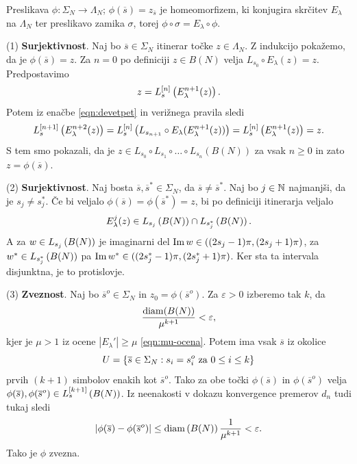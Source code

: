 \begin{izrek}
    Preslikava \(\phi \colon \Sigma_N \to \Lambda_N\); \(\phi (\overline{s}) = z_{\overline{s}}\) je homeomorfizem, ki konjugira skrčitev \(E_\lambda\) na \(\Lambda_N\) ter preslikavo zamika \(\sigma\), torej \(\phi \circ \sigma = E_\lambda \circ \phi\).
\end{izrek}

\begin{dokaz}
    (1) \textbf{Surjektivnost}. Naj bo \(\overline{s} \in \Sigma_N\) itinerar točke \(z \in \Lambda_N\). Z indukcijo pokažemo, da je \(\phi (\overline{s}) = z\). Za \(n = 0\) po definiciji \(z \in B (N)\) velja \(L_{s_0} \circ E_\lambda (z) = z\). Predpostavimo
    \[z = L_{s}^{[n]} \left( E_{\lambda}^{n + 1} (z) \right).\]
    Potem iz enačbe \eqref{eqn:devetpet} in verižnega pravila sledi
    \[L_{s}^{[n + 1]} \left( E_{\lambda}^{n + 2} (z) \right) = L_{s}^{[n]} \left( L_{s_{n + 1}} \circ E_\lambda (E_\lambda^{n + 1} (z)) \right) = L_{s}^{[n]} \left( E_\lambda^{n + 1} (z) \right) = z.\]
    S tem smo pokazali, da je \(z \in L_{s_0} \circ L_{s_1} \circ \dots \circ L_{s_n} (B (N))\) za vsak \(n \geq 0\) in zato \(z = \phi (\overline{s})\).

    (2) \textbf{Surjektivnost}. Naj bosta \(\overline{s}, \overline{s}^* \in \Sigma_N\), da \(\overline{s} \neq \overline{s}^*\). Naj bo \(j \in \mathbb N\) najmanjši, da je \(s_j \neq s_j^*\). Če bi veljalo \(\phi (\overline{s}) = \phi (\overline{s}^*) = z\), bi po definiciji itinerarja veljalo
    \[E_\lambda^j (z)\in L_{s_j} \left( B (N) \right) \cap L_{s_j^*} \left( B (N) \right).\]
    A za \(w \in L_{s_j} \left( B (N) \right)\) je imaginarni del \(\operatorname{Im} w \in ((2 s_j - 1) \pi, (2 s_j + 1) \pi)\), za \(w^* \in L_{s_j^*} \left( B (N) \right)\) pa \(\operatorname{Im} w^* \in ((2 s_j^* - 1) \pi, (2 s_j^* + 1) \pi)\). Ker sta ta intervala disjunktna, je to protislovje.

    (3) \textbf{Zveznost}. Naj bo \(\overline{s}^o \in \Sigma_N\) in \(z_0 = \phi (\overline{s}^o)\). Za \(\varepsilon > 0\) izberemo tak \(k\), da
    \[\frac{\operatorname{diam} (B (N))}{\mu^{k + 1}} < \varepsilon,\]
    kjer je \(\mu > 1\) iz ocene \(|E_\lambda'| \geq \mu\) \eqref{eqn:mu-ocena}. Potem ima vsak \(\overline{s}\) iz okolice
    \[U = \left\{ \overline{s} \in \Sigma_N : s_i = s_i^o \text{ za } 0 \leq i \leq k \right\}\]
    prvih \((k + 1)\) simbolov enakih kot \(\overline{s}^o\). Tako za obe točki \(\phi (\overline{s})\) in \(\phi (\overline{s}^o)\) velja \(\phi (\overline{s}), \phi (\overline{s}^o) \in L_s^{[k + 1]} \left( B (N) \right)\). Iz neenakosti v dokazu konvergence premerov \(d_n\) tudi tukaj sledi
    \[\left| \phi (\overline{s}) - \phi (\overline{s}^o) \right| \leq \operatorname{diam} \left( B (N) \right) \frac{1}{\mu^{k + 1}} < \varepsilon.\]
    Tako je \(\phi\) zvezna.


\end{dokaz}
